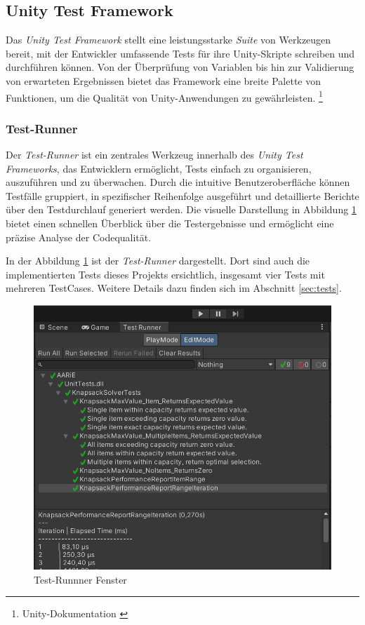 \subsection{\label{sec:testFramework}Unity Test Framework}

Das \textit{Unity Test Framework} stellt eine leistungsstarke \textit{Suite} von Werkzeugen bereit, mit der Entwickler umfassende Tests für ihre Unity-Skripte schreiben und durchführen können. Von der Überprüfung von Variablen bis hin zur Validierung von erwarteten
Ergebnissen bietet das Framework eine breite Palette von Funktionen, um die Qualität von Unity-Anwendungen zu gewährleisten. \footnote{Unity-Dokumentation \cite{UnityTestFramework}}

\subsubsection{\label{sec:testRunner} Test-Runner}

Der \textit{Test-Runner} ist ein zentrales Werkzeug innerhalb des \textit{Unity Test Frameworks}, das Entwicklern ermöglicht, Tests einfach zu organisieren, auszuführen und zu überwachen. Durch die intuitive Benutzeroberfläche können Testfälle gruppiert, in spezifischer Reihenfolge ausgeführt und detaillierte Berichte über den Testdurchlauf generiert werden. Die visuelle Darstellung in Abbildung \ref{fig:testRunner} bietet einen schnellen Überblick über die Testergebnisse und ermöglicht eine präzise Analyse der Codequalität.

In der Abbildung \ref{fig:testRunner} ist der \textit{Test-Runner} dargestellt. Dort sind auch die implementierten Tests dieses Projekts ersichtlich, insgesamt vier Tests mit mehreren TestCases. Weitere Details dazu finden sich im Abschnitt \ref{sec:tests}.

\begin{figure}[H]
\centering
\includegraphics[scale=0.5, angle=0]{images/testRunner}
\caption{Test-Runnner Fenster}
\label{fig:testRunner}
\end{figure}


